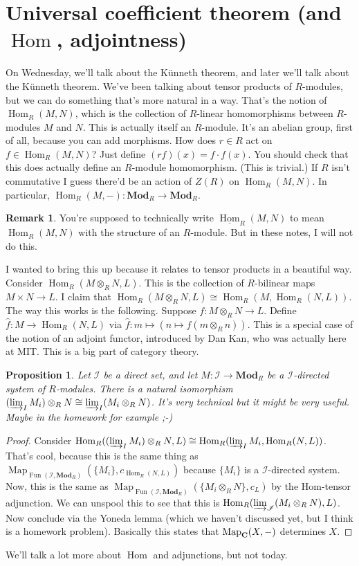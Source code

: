 \documentclass{amsart}
\theoremstyle{theorem}
\newtheorem{prop}[theorem]{Proposition}
\theoremstyle{definition}
\newtheorem{remark}[theorem]{Remark}
\DeclareMathOperator{\Fun}{Fun}
\DeclareMathOperator{\Hom}{Hom}
\DeclareMathOperator{\Map}{Map}
\def\cI{\mathscr I}\def\cJ{\mathscr J}\def\cK{\mathscr K}\def\cL{\mathscr L}
\begin{document}
\section{Universal coefficient theorem (and $\Hom$, adjointness)}
On Wednesday, we'll talk about the K\"{u}nneth theorem, and later we'll talk about the K\"{u}nneth theorem. We've been talking about tensor products of $R$-modules, but we can do something that's more natural in a way. That's the notion of $\Hom_R(M,N)$, which is the collection of $R$-linear homomorphisms between $R$-modules $M$ and $N$. This is actually itself an $R$-module. It's an abelian group, first of all, because you can add morphisms. How does $r\in R$ act on $f\in \Hom_R(M,N)$? Just define $(rf)(x)=f\cdot f(x)$. You should check that this does actually define an $R$-module homomorphism. (This is trivial.) If $R$ isn't commutative I guess there'd be an action of $Z(R)$ on $\Hom_R(M,N)$. In particular, $\Hom_R(M,-):\mathbf{Mod}_R\to\mathbf{Mod}_R$.
\begin{remark}
You're supposed to technically write $\underline{\Hom}_R(M,N)$ to mean $\Hom_R(M,N)$ with the structure of an $R$-module. But in these notes, I will not do this.
\end{remark}
I wanted to bring this up because it relates to tensor products in a beautiful way. Consider $\Hom_R(M\otimes_R N,L)$. This is the collection of $R$-bilinear maps $M\times N\to L$. I claim that $\Hom_R(M\otimes_R N,L)\cong\Hom_R(M,\Hom_R(N,L))$. The way this works is the following. Suppose $f:M\otimes_R N\to L$. Define $\widehat{f}:M\to\Hom_R(N,L)$ via $\widehat{f}:m\mapsto(n\mapsto f(m\otimes_R n))$. This is a special case of the notion of an adjoint functor, introduced by Dan Kan, who was actually here at MIT. This is a big part of category theory.
\begin{prop}
Let $\cI$ be a direct set, and let $M:\cI\to\mathbf{Mod}_R$ be a $\cI$-directed system of $R$-modules. There is a natural isomorphism $(\varinjlim_I M_i)\otimes_R N\cong \varinjlim_I (M_i\otimes_R N)$. It's very technical but it might be very useful. Maybe in the homework for example \emph{;-)}
\end{prop}
\begin{proof}
Consider $\Hom_R((\varinjlim_I M_i)\otimes_R N,L)\cong\Hom_R(\varinjlim_I M_i,\Hom_R(N,L))$. That's cool, because this is the same thing as $\Map_{\Fun(\cI,\mathbf{Mod}_R)}(\{M_i\},c_{\Hom_R(N,L)})$ because $\{M_i\}$ is a $\cI$-directed system. Now, this is the same as $\Map_{\Fun(\cI,\mathbf{Mod}_R)}(\{M_i\otimes_R N\},c_{L})$ by the Hom-tensor adjunction. We can unspool this to see that this is $\Hom_R(\varinjlim_\cI (M_i\otimes_R N),L)$. Now conclude via the Yoneda lemma (which we haven't discussed yet, but I think is a homework problem). Basically this states that $\Map_\cc(X,-)$ determines $X$.
\end{proof}
We'll talk a lot more about $\Hom$ and adjunctions, but not today.
\end{document}
